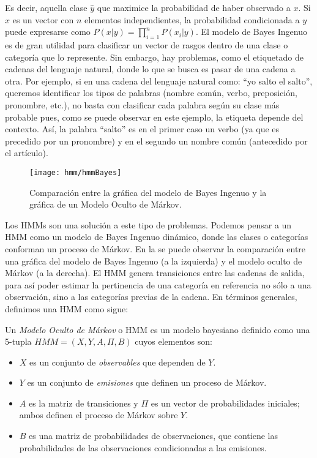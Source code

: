 Es decir, aquella clase $\hat{y}$ que maximice la probabilidad de haber observado a $x$.  Si $x$ es un vector con $n$ elementos independientes, la probabilidad condicionada a $y$ puede expresarse como $P(x|y) = \prod_{i=1}^n P(x_i | y)$. El modelo de Bayes Ingenuo es de gran utilidad para clasificar un vector de rasgos dentro de una clase o categoría que lo represente. Sin embargo, hay problemas, como el etiquetado de cadenas del lenguaje natural, donde lo que se busca es pasar de una cadena a otra. Por ejemplo, si en una cadena del lenguaje natural como: ``yo salto el salto'', queremos identificar los tipos de palabras (nombre común, verbo, preposición, pronombre, etc.), no basta con clasificar cada palabra según su clase más probable pues, como se puede observar en este ejemplo, la etiqueta depende del contexto. Así, la palabra ``salto'' es en el primer caso un verbo (ya que es precedido por un pronombre) y en el segundo un nombre común (antecedido por el artículo).

\begin{figure}
 \centering
 \texttt{[image: hmm/hmmBayes]}
 \caption{Comparación entre la gráfica del modelo de Bayes Ingenuo y la gráfica de un Modelo Oculto de Márkov.}\label{Fig:BayesMárkov}
\end{figure}

Los HMMs son una solución a este tipo de problemas. Podemos pensar a un HMM como un modelo de Bayes Ingenuo dinámico, donde las clases o categorías conforman un proceso de Márkov. En la  se puede observar la comparación entre una gráfica del modelo de Bayes Ingenuo (a la izquierda) y el modelo oculto de Márkov (a la derecha). El HMM genera transiciones entre las cadenas de salida, para así poder estimar la pertinencia de una categoría en referencia no sólo a una observación, sino a las categorías previas de la cadena. En términos generales, definimos una HMM como sigue:


\begin{definition}
  Un \emph{Modelo Oculto de Márkov} o HMM es un modelo bayesiano definido como una 5-tupla $HMM = (X, Y, A, \Pi, B)$ cuyos elementos son:

\begin{itemize}
    \item $X$ es un conjunto de \emph{observables} que dependen de $Y$.
    \item  $Y$ es un conjunto de \emph{emisiones} que definen un proceso de Márkov.
    \item $A$ es la matriz de transiciones y $\Pi$ es un vector de probabilidades iniciales; ambos definen el proceso de Márkov sobre $Y$.
    \item $B$ es una matriz de probabilidades de observaciones, que contiene las probabilidades de las observaciones condicionadas a las emisiones.
  \end{itemize}
\end{definition}

